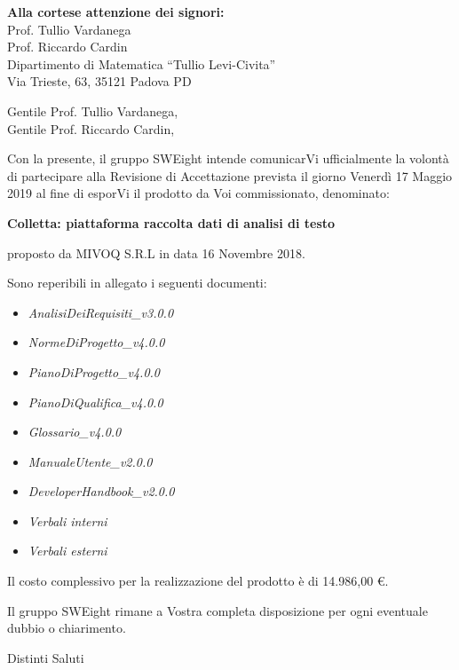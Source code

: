 \documentclass[11pt]{brownletter}
\date{Padova, 16 Maggio 2019} %
\newcommand{\AdR}{\emph{AnalisiDeiRequisiti\_v3.0.0}}
\newcommand{\NdP}{\emph{NormeDiProgetto\_v4.0.0}}
\newcommand{\PdP}{\emph{PianoDiProgetto\_v4.0.0}}
\newcommand{\PdQ}{\emph{PianoDiQualifica\_v4.0.0}}
\newcommand{\G}{\emph{Glossario\_v4.0.0}}
\newcommand{\MU}{\emph{ManualeUtente\_v2.0.0}}
\newcommand{\MS}{\emph{DeveloperHandbook\_v2.0.0}}
\begin{document}
\begin{letter}{\textbf{Alla cortese attenzione dei signori:}\\
	Prof. Tullio Vardanega\\
	Prof. Riccardo Cardin\\
	Dipartimento di Matematica “Tullio Levi-Civita”\\
	Via Trieste, 63, 35121 Padova PD}

\opening{	Gentile Prof. Tullio Vardanega,\\
			Gentile Prof. Riccardo Cardin,\\}

Con la presente, il gruppo SWEight intende comunicarVi ufficialmente la volontà di partecipare alla Revisione di Accettazione prevista il giorno Venerdì 17 Maggio 2019 al fine di esporVi il prodotto da Voi commissionato, denominato:
\begin{center}
	\textbf{Colletta: piattaforma raccolta dati di analisi di testo}
\end{center}
proposto da MIVOQ S.R.L in data 16 Novembre 2018.

Sono reperibili in allegato i seguenti documenti:
\begin{itemize}
	\item \AdR
	\item \NdP
	\item \PdP
	\item \PdQ
	\item \G
	\item \MU
	\item \MS
	\item \emph{Verbali interni}
	\item \emph{Verbali esterni}
\end{itemize}
Il costo complessivo per la realizzazione del prodotto è di 14.986,00 \euro{}.

Il gruppo SWEight rimane a Vostra completa disposizione per ogni eventuale dubbio o chiarimento.
\closing{Distinti Saluti}

\end{letter}
\end{document}

